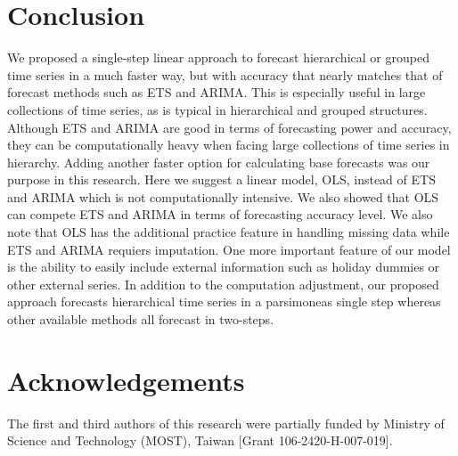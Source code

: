 \documentclass[11pt,a4paper,]{article}
\begin{document}
\section{Conclusion}\label{conclusion}

We proposed a single-step linear approach to forecast hierarchical or
grouped time series in a much faster way, but with accuracy that nearly
matches that of forecast methods such as ETS and ARIMA. This is
especially useful in large collections of time series, as is typical in
hierarchical and grouped structures. Although ETS and ARIMA are good in
terms of forecasting power and accuracy, they can be computationally
heavy when facing large collections of time series in hierarchy. Adding
another faster option for calculating base forecasts was our purpose in
this research. Here we suggest a linear model, OLS, instead of ETS and
ARIMA which is not computationally intensive. We also showed that OLS
can compete ETS and ARIMA in terms of forecasting accuracy level. We
also note that OLS has the additional practice feature in handling
missing data while ETS and ARIMA requiers imputation. One more important
feature of our model is the ability to easily include external
information such as holiday dummies or other external series. In
addition to the computation adjustment, our proposed approach forecasts
hierarchical time series in a parsimoneas single step whereas other
available methods all forecast in two-steps.

\section{Acknowledgements}\label{acknowledgements}

The first and third authors of this research were partially funded by
Ministry of Science and Technology (MOST), Taiwan {[}Grant
106-2420-H-007-019{]}.

\printbibliography[title=References]
\end{document}
